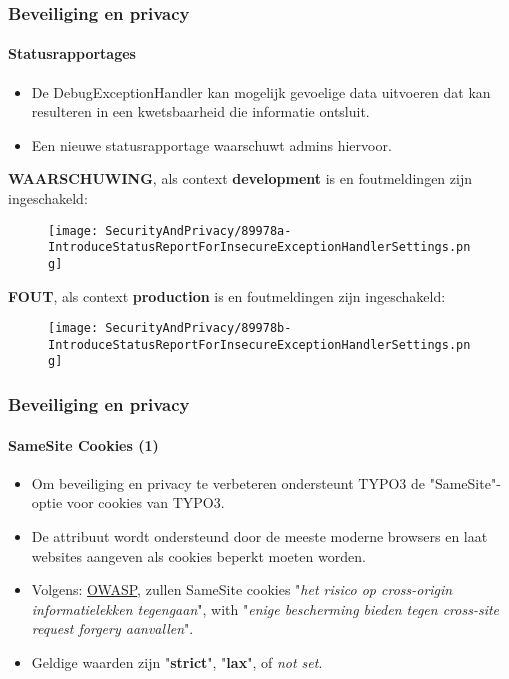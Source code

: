 \begin{frame}[fragile]
	\frametitle{Beveiliging en privacy}
	\framesubtitle{Statusrapportages}

	\begin{itemize}
		\item De DebugExceptionHandler kan mogelijk gevoelige data uitvoeren dat kan
			resulteren in een kwetsbaarheid die informatie ontsluit.
		\item Een nieuwe statusrapportage waarschuwt admins hiervoor.
	\end{itemize}

	\vspace{0.4cm}
	\textbf{WAARSCHUWING}, als context \textbf{development} is en foutmeldingen zijn ingeschakeld:
	\begin{figure}
		\texttt{[image: SecurityAndPrivacy/89978a-IntroduceStatusReportForInsecureExceptionHandlerSettings.png]}
	\end{figure}

	\textbf{FOUT}, als context \textbf{production} is en foutmeldingen zijn ingeschakeld:
	\begin{figure}
		\texttt{[image: SecurityAndPrivacy/89978b-IntroduceStatusReportForInsecureExceptionHandlerSettings.png]}
	\end{figure}

\end{frame}


\begin{frame}[fragile]
	\frametitle{Beveiliging en privacy}
	\framesubtitle{SameSite Cookies (1)}

	\begin{itemize}
		\item Om beveiliging en privacy te verbeteren ondersteunt TYPO3 de "SameSite"-optie
			voor cookies van TYPO3.
		\item De attribuut wordt ondersteund door de meeste moderne browsers en laat websites
			aangeven als cookies beperkt moeten worden.
		\item Volgens:
			\href{https://www.owasp.org/index.php/SameSite}{OWASP}, zullen SameSite cookies\newline
			\small
				"\textit{het risico op cross-origin informatielekken tegengaan}", with\newline
				"\textit{enige bescherming bieden tegen cross-site request forgery aanvallen}".
			\normalsize

		\item Geldige waarden zijn "\textbf{strict}", "\textbf{lax}", of \textit{not set}.
	\end{itemize}

\end{frame}

